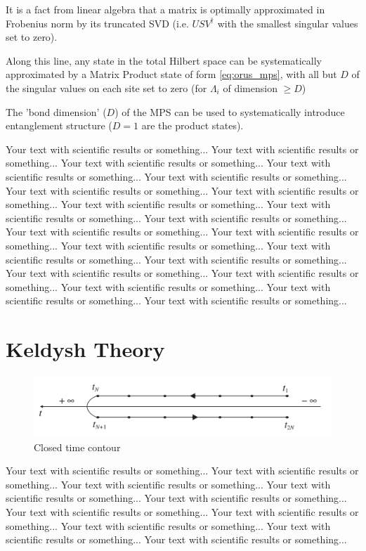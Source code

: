 \documentclass[final]{beamer}
\begin{document}
\begin{frame}[t]
\begin{multicols}{3}
It is a fact from linear algebra that a matrix is optimally approximated in Frobenius norm by its truncated SVD (i.e. $USV^\dagger$ with the smallest singular values set to zero).

Along this line, any state in the total Hilbert space can be systematically approximated by a Matrix Product state of form \ref{eq:orus_mps}, with all but $D$ of the singular values on each site set to zero (for $\Lambda_i$ of dimension $\geq D$)

The 'bond dimension' ($D$) of the MPS can be used to systematically introduce entanglement structure ($D=1$ are the product states).

Your text with scientific results or something... 
Your text with scientific results or something... 
Your text with scientific results or something... 
Your text with scientific results or something... 
Your text with scientific results or something... 
Your text with scientific results or something... 
Your text with scientific results or something... 
Your text with scientific results or something... 
Your text with scientific results or something... 
Your text with scientific results or something... 
Your text with scientific results or something... 
Your text with scientific results or something... 
Your text with scientific results or something... 
Your text with scientific results or something... 
Your text with scientific results or something... 
Your text with scientific results or something... 
Your text with scientific results or something... 
Your text with scientific results or something... 
Your text with scientific results or something... 
Your text with scientific results or something... 

\section{Keldysh Theory}

\begin{figure}[h]
    \includegraphics[width=\linewidth]{keldyshcontour}
    \caption{Closed time contour\cite{Kamenev2011}}
\end{figure}
Your text with scientific results or something... 
Your text with scientific results or something... 
Your text with scientific results or something... 
Your text with scientific results or something... 
Your text with scientific results or something... 
Your text with scientific results or something... 
Your text with scientific results or something... 
Your text with scientific results or something... 
Your text with scientific results or something... 
Your text with scientific results or something... 


\end{multicols}
\end{frame}
\end{document}
